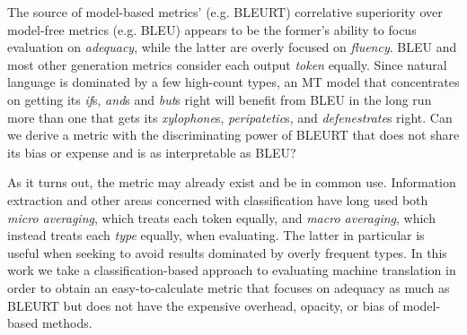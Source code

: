 The source of model-based metrics' (e.g. BLEURT) correlative superiority over model-free metrics (e.g. BLEU) appears to be the former's ability to focus evaluation on \textit{adequacy}, while the latter are overly focused on \textit{fluency}. BLEU and most other generation metrics consider each output \textit{token} equally. Since natural language is dominated by a few high-count types, an MT model that concentrates on getting its \textit{if}s, \textit{and}s and \textit{but}s right will benefit from BLEU in the long run more than one that gets its \textit{xylophone}s, \textit{peripatetic}s, and \textit{defenestrate}s right. Can we derive a metric with the discriminating power of BLEURT that does not share its bias or expense and is as interpretable as BLEU? 

As it turns out, the metric may already exist and be in common use. Information extraction and other areas concerned with classification have long used both \textit{micro averaging}, which treats each token equally, and \textit{macro averaging}, which instead treats each \textit{type} equally, when evaluating. The latter in particular is useful when seeking to avoid results dominated by overly frequent types.  In this work we take a classification-based approach to evaluating machine translation in order to obtain an easy-to-calculate metric that focuses on adequacy as much as BLEURT but does not have the expensive overhead, opacity, or bias of model-based methods. 


